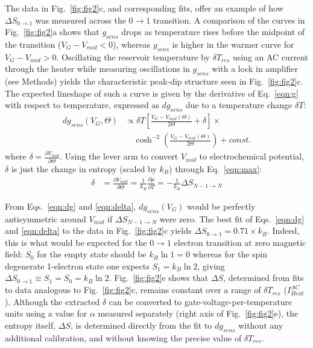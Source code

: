 \documentclass[twocolumn,showpacs,preprintnumbers,amsmath,amssymb,pra,aps,superscriptaddress]{revtex4-1}
\begin{document}
The data in Fig.~\ref{fig:fig2}c, and corresponding fits, offer an example of how $\Delta S_{0\rightarrow 1}$ was measured across the $0 \rightarrow 1$ transition.  A comparison of the curves in Fig.~\ref{fig:fig2}a shows that $g_{sens}$ drops as temperature rises before the midpoint of the transition ($V_G-V_{mid}<0$), whereas $g_{sens}$ is higher in the warmer curve for $V_G-V_{mid}>0$.   Oscillating the reservoir temperature by $\delta T_{res}$ using an AC current through the heater while measuring oscillations in $g_{sens}$ with a lock in amplifier (see Methods) yields the characteristic peak-dip structure seen in Fig.~\ref{fig:fig2}c.  The expected lineshape of such a curve is given by the derivative of Eq.~\ref{eqn:g} with respect to temperature, expressed as $dg_{sens}$ due to a temperature change $\delta T$:
%
\begin{align}
\label{eqn:dg}
        dg_{sens}(V_G, \Theta) &\propto \delta T \left[ \frac{V_G-V_{mid}(\Theta)}{2\Theta} +\delta \right]\times \\
        				      &\quad\cosh^{-2}\left(\frac{V_G-V_{mid}(\Theta)}{2\Theta}\right) + const. \nonumber
\end{align}
%
where $\delta=\frac{\partial V_{mid}}{\partial \Theta}$. Using the lever arm to convert $V_{mid}$ to electrochemical potential, $\delta$ is just the change in entropy (scaled by $k_B$) through Eq.~\ref{eqn:max}:
%
\begin{align}
\label{eqn:delta}
        \delta &= \frac{\partial V_{mid}}{\partial \Theta} = 
        \frac{1}{k_B} \frac{\partial \mu}{\partial T} = 
        -\frac{1}{k_B} \Delta S_{N-1\rightarrow N}
\end{align}
%

From Eqs.~\ref{eqn:dg} and \ref{eqn:delta}, $dg_{sens}(V_G)$ would be perfectly antisymmetric around $V_{mid}$ if $\Delta S_{N-1\rightarrow N}$ were zero.  The best fit of Eqs.~\ref{eqn:dg} and \ref{eqn:delta} to the data in Fig.~\ref{fig:fig2}c yields $\Delta S_{0\rightarrow 1}=0.71\times k_B$.  Indeed, this is what would be expected for the $0 \rightarrow 1$ electron transition at zero magnetic field: $S_0$ for the empty state should be $k_B \ln{1}=0$ whereas for the spin degenerate 1-electron state one expects $S_1=k_B\ln{2}$, giving $\Delta S_{0\rightarrow 1}\equiv S_1 = S_0 =k_B\ln{2}$. Fig.~\ref{fig:fig2}e shows that $\Delta S$,  determined from fits to data analogous to Fig.~\ref{fig:fig2}c, remains constant over a range of $\delta T_{res}$ ($I^{AC}_{Heat}$).  Although the extracted $\delta$ can be converted to gate-voltage-per-temperature units using a value for $\alpha$ measured separately (right axis of Fig.~\ref{fig:fig2}e), the entropy itself, $\Delta S$, is determined directly from the fit to $dg_{sens}$ without any additional calibration, and without knowing the precise value of $\delta T_{res}$.
\end{document}
